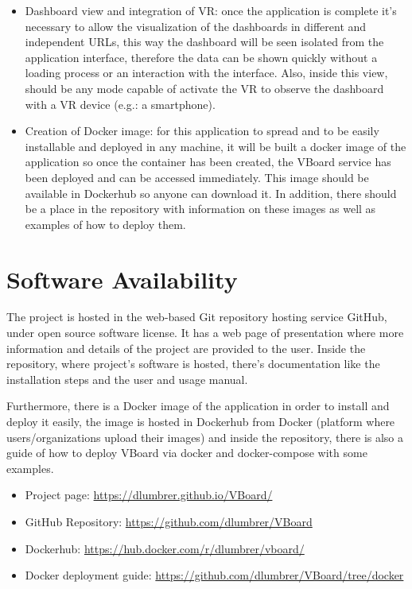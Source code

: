 \documentclass[a4paper, 12pt]{book}
\begin{document}
\begin{itemize}
\item Dashboard view and integration of VR: once the application is complete it's necessary to allow the visualization of the dashboards in different and independent URLs, this way the dashboard will be seen isolated from the application interface, therefore the data can be shown quickly without a loading process or an interaction with the interface. Also, inside this view, should be any mode capable of activate the VR to observe the dashboard with a VR device (e.g.: a smartphone).
\item Creation of Docker image: for this application to spread and to be easily installable and deployed in any machine, it will be built a docker image of the application so once the container has been created, the VBoard service has been deployed and can be accessed immediately. This image should be available in Dockerhub so anyone can download it. In addition, there should be a place in the repository with information on these images as well as examples of how to deploy them.
\end{itemize}

\section{Software Availability}
\label{sec:softavail}

The project is hosted in the web-based Git repository hosting service GitHub, under open source software license. It has a web page of presentation where more information and details of the project are provided to the user. Inside the repository, where project's software is hosted, there's documentation like the installation steps and the user and usage manual.

Furthermore, there is a Docker image of the application in order to install and deploy it easily, the image is hosted in Dockerhub from Docker (platform where users/organizations upload their images) and inside the repository, there is also a guide of how to deploy VBoard via docker and docker-compose with some examples. 

\begin{itemize}
\item Project page: \url{https://dlumbrer.github.io/VBoard/}
\item GitHub Repository: \url{https://github.com/dlumbrer/VBoard}
\item Dockerhub: \url{https://hub.docker.com/r/dlumbrer/vboard/}
\item Docker deployment guide: \url{https://github.com/dlumbrer/VBoard/tree/docker}
\end{itemize}
\end{document}
